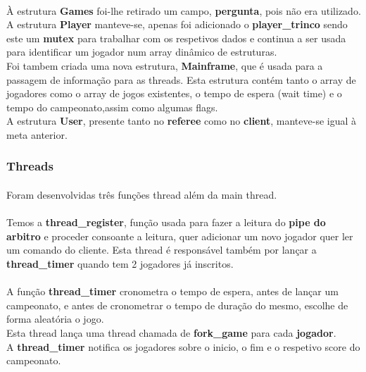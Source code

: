 \documentclass[letterpaper, 11pt]{article}
\begin{document}
\paragraph{}
À estrutura \textbf{Games} foi-lhe retirado um campo, \textbf{pergunta}, pois não era utilizado.\\
A estrutura \textbf{Player} manteve-se, apenas foi adicionado o \textbf{player\_trinco} sendo este um \textbf{mutex} para trabalhar com os respetivos dados e continua a ser usada para identificar um jogador num array dinâmico de estruturas.\\
Foi tambem criada uma nova estrutura, \textbf{Mainframe}, que é usada para a passagem de informação para as threads. Esta estrutura contém tanto o array de jogadores como o array de jogos existentes, o tempo de espera (wait time) e o tempo do campeonato,assim como algumas flags. \\
A estrutura \textbf{User}, presente tanto no \textbf{referee} como no \textbf{client}, manteve-se igual à meta anterior.

\subsubsection{Threads}
\label{sec:org432ae7a}

\paragraph{}
Foram desenvolvidas três funções thread além da main thread.
\paragraph{}
Temos a \textbf{thread\_register}, função usada para fazer a leitura do \textbf{pipe do arbitro} e proceder consoante a leitura, quer adicionar um novo jogador quer ler um comando do cliente. Esta thread é responsável também por lançar a \textbf{thread\_timer} quando tem 2 jogadores já inscritos.
\paragraph{}
A função \textbf{thread\_timer} cronometra o tempo de espera, antes de lançar um campeonato, e antes de cronometrar o tempo de duração do mesmo, escolhe de forma aleatória o jogo.\\
Esta thread lança uma thread chamada de \textbf{fork\_game} para cada \textbf{jogador}.\\
A \textbf{thread\_timer} notifica os jogadores sobre o inicio, o fim e o respetivo score do campeonato.
\end{document}
